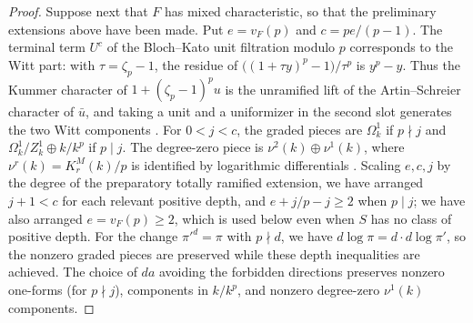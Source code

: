 \begin{proof}
Suppose next that $F$ has mixed characteristic, so that the preliminary extensions above have been made.
Put $e=v_F(p)$ and $c=pe/(p-1)$.
The terminal term $U^c$ of the Bloch--Kato unit filtration modulo $p$ corresponds to the Witt part: with $\tau=\zeta_p-1$, the residue of $\bigl((1+\tau y)^p-1\bigr)/\tau^p$ is $y^p-y$.
Thus the Kummer character of $1+(\zeta_p-1)^pu$ is the unramified lift of the Artin--Schreier character of $\bar u$, and taking a unit and a uniformizer in the second slot generates the two Witt components \cite[(5.1)--(5.3)]{BlochKato1986}.
For $0<j<c$, the graded pieces are $\Omega^1_k$ if $p\nmid j$ and $\Omega^1_k/Z^1_k\oplus k/k^p$ if $p\mid j$.
The degree-zero piece is $\nu^2(k)\oplus\nu^1(k)$, where $\nu^r(k)=K_r^M(k)/p$ is identified by logarithmic differentials \cite[(5.1)--(5.3)]{BlochKato1986}.
Scaling $e,c,j$ by the degree of the preparatory totally ramified extension, we have arranged $j+1<c$ for each relevant positive depth, and $e+j/p-j\ge2$ when $p\mid j$; we have also arranged $e=v_F(p)\ge2$, which is used below even when $S$ has no class of positive depth.
For the change $\pi'^d=\pi$ with $p\nmid d$, we have $d\log\pi=d\cdot d\log\pi'$, so the nonzero graded pieces are preserved while these depth inequalities are achieved.
The choice of $da$ avoiding the forbidden directions preserves nonzero one-forms (for $p\nmid j$), components in $k/k^p$, and nonzero degree-zero $\nu^1(k)$ components.


\end{proof}
